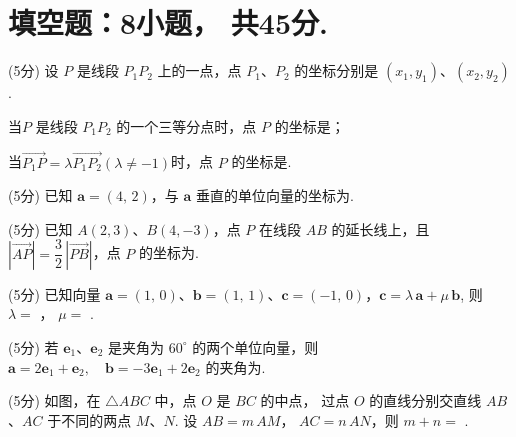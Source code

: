 \documentclass[12pt, a4paper]{article}
\begin{document}
\section{填空题：8小题， 共45分. }
\begin{question}[resume]
\item (5分) 设 $P$ 是线段 $P_{1}P_{2}$ 上的一点，点 $P_{1}$、$P_{2}$ 的坐标分别是 $(x_{1},y_{1})$、$(x_{2},y_{2})$. 
\begin{question}
    \item 当$P$ 是线段 $P_{1}P_{2}$ 的一个三等分点时，点 $P$ 的坐标是\underline{\hspace{6em}}；
    \item 当$\overrightarrow{P_1P}=\lambda \overrightarrow{P_1P_2}(\lambda\neq -1)$时，点 $P$ 的坐标是\underline{\hspace{8em}}. 
\end{question}
\item (5分) 已知 $\bm{a} = (4,\,2)$，与 $\bm{a}$ 垂直的单位向量的坐标为\underline{\hspace{6em}}. 
\item (5分) 已知 $A(2,3)$、$B(4,-3)$，点 $P$ 在线段 $AB$ 的延长线上，且
$| \overrightarrow{AP}|=\dfrac{3}{2}\,| \overrightarrow{PB}|$，点 $P$ 的坐标为\underline{\hspace{6em}}. 
\item (5分) 已知向量 $\bm{a}=(1,\,0)$、$\bm{b}=(1,\,1)$、$\bm{c}=(-1,\,0)$，$\bm{c}=\lambda\,\bm{a}+\mu\,\bm{b}$, 则 $\lambda=$ \underline{\hspace{6em}}， $\mu=$ \underline{\hspace{6em}}.
\item (5分) 若 $\bm{e}_{1}$、$\bm{e}_{2}$ 是夹角为 $60^\circ$ 的两个单位向量，则
$
\bm{a}=2\bm{e}_{1}+\bm{e}_{2}, \quad
\bm{b}=-3\bm{e}_{1}+2\bm{e}_{2}
$
的夹角为\underline{\hspace{6em}}. 

\item (5分) 如图，在 $\triangle ABC$ 中，点 $O$ 是 $BC$ 的中点，
过点 $O$ 的直线分别交直线 $AB$、$AC$ 于不同的两点 $M$、$N$. 
设 $AB = m\,AM$，
$AC = n\,AN$，则 $m+n=$ \underline{\hspace{6em}}. 

\end{question}
\end{document}
